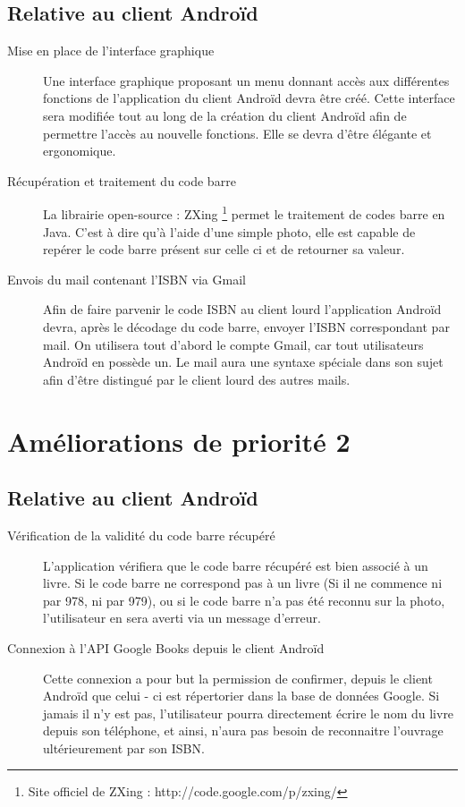\subsection{Relative au client Androïd}
\begin{description}

\item[Mise en place de l'interface graphique]
	Une interface graphique proposant un menu donnant accès aux différentes fonctions de l'application du client Androïd devra être créé. 
	Cette interface sera modifiée tout au long de la création du client Androïd afin de permettre l'accès au nouvelle fonctions.
	Elle se devra d'être élégante et ergonomique.

\item[Récupération et traitement du code barre]
	La librairie open-source : ZXing \footnote{Site officiel de ZXing : http://code.google.com/p/zxing/} 
	permet le traitement de codes barre en Java. 
	C'est à dire qu'à l'aide d'une simple photo, elle est capable de repérer le code barre présent sur celle ci et de retourner sa valeur.

\item[Envois du mail contenant l'ISBN via Gmail]
	Afin de faire parvenir le code ISBN au client lourd l'application Androïd devra, après le décodage du code barre, envoyer l'ISBN correspondant par mail. 
	On utilisera tout d'abord le compte Gmail, car tout utilisateurs Androïd en possède un. 
	Le mail aura une syntaxe spéciale dans son sujet afin d'être distingué par le client lourd des autres mails.

\end{description}

\section{Améliorations de priorité 2}

\subsection{Relative au client Androïd}

\begin{description}

\item[Vérification de la validité du code barre récupéré]
	L'application vérifiera que le code barre récupéré est bien associé à un livre. 
	Si le code barre ne correspond pas à un livre (Si il ne commence ni par 978, ni par 979), ou si le code barre n'a pas été reconnu sur la photo, l'utilisateur en sera averti via un message d'erreur.

\item[Connexion à l'API Google Books depuis le client Androïd]
	Cette connexion a pour but la permission de confirmer, depuis le client Androïd que celui - ci est répertorier dans la base de données Google. 
	Si jamais il n'y est pas, l'utilisateur pourra directement écrire le nom du livre depuis son téléphone, et ainsi, n'aura pas besoin de reconnaitre l'ouvrage ultérieurement par son ISBN.

\end{description}

